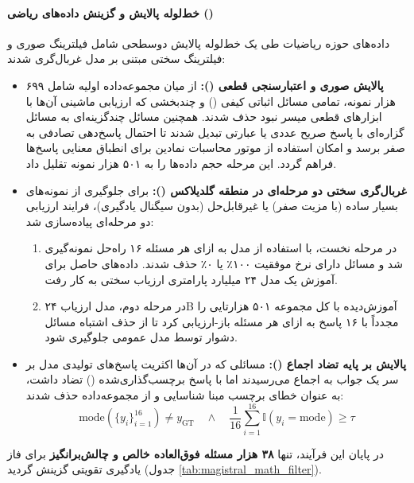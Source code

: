\paragraph*{خط‌لوله پالایش و گزینش داده‌های ریاضی ()}
داده‌های حوزه ریاضیات طی یک خط‌لوله پالایش دوسطحی شامل فیلترینگ صوری و فیلترینگ سختی مبتنی بر مدل غربال‌گری شدند:
\begin{itemize}
    \item \textbf{پالایش صوری و اعتبارسنجی قطعی ():} از میان مجموعه‌داده اولیه شامل ۶۹۹ هزار نمونه، تمامی مسائل اثباتی کیفی () و چندبخشی که ارزیابی ماشینی آن‌ها با ابزارهای قطعی میسر نبود حذف شدند. همچنین مسائل چندگزینه‌ای به مسائل گزاره‌ای با پاسخ صریح عددی یا عبارتی تبدیل شدند تا احتمال پاسخ‌دهی تصادفی به صفر برسد و امکان استفاده از موتور محاسبات نمادین  برای انطباق معنایی پاسخ‌ها فراهم گردد. این مرحله حجم داده‌ها را به ۵۰۱ هزار نمونه تقلیل داد.
    \item \textbf{غربال‌گری سختی دو مرحله‌ای در منطقه گلدیلاکس ():} برای جلوگیری از نمونه‌های بسیار ساده (با مزیت صفر) یا غیرقابل‌حل (بدون سیگنال یادگیری)، فرایند ارزیابی دو مرحله‌ای پیاده‌سازی شد:
    \begin{enumerate}
        \item در مرحله نخست، با استفاده از مدل  \cite{mistral2024large2} به ازای هر مسئله ۱۶ راه‌حل نمونه‌گیری شد و مسائل دارای نرخ موفقیت ۱۰۰٪ یا ۰٪ حذف شدند. داده‌های حاصل برای آموزش یک مدل ۲۴ میلیارد پارامتری ارزیاب سختی به کار رفت.
        \item در مرحله دوم، مدل ارزیاب ۲۴B آموزش‌دیده با  کل مجموعه ۵۰۱ هزارتایی را مجدداً با ۱۶ پاسخ به ازای هر مسئله باز-ارزیابی کرد تا از حذف اشتباه مسائل دشوار توسط مدل عمومی جلوگیری شود.
    \end{enumerate}
    \item \textbf{پالایش بر پایه تضاد اجماع ():} مسائلی که در آن‌ها اکثریت پاسخ‌های تولیدی مدل بر سر یک جواب به اجماع می‌رسیدند اما با پاسخ برچسب‌گذاری‌شده () تضاد داشت، به عنوان خطای برچسب مبنا شناسایی و از مجموعه‌داده حذف شدند:
    \begin{equation}
        \text{mode}(\{y_i\}_{i=1}^{16}) \neq y_{\text{GT}} \quad \wedge \quad \frac{1}{16}\sum_{i=1}^{16} \mathbb{I}(y_i = \text{mode}) \ge \tau
    \end{equation}
\end{itemize}
در پایان این فرآیند، تنها \textbf{۳۸ هزار مسئله فوق‌العاده خالص و چالش‌برانگیز} برای فاز یادگیری تقویتی گزینش گردید (جدول \ref{tab:magistral_math_filter}).

